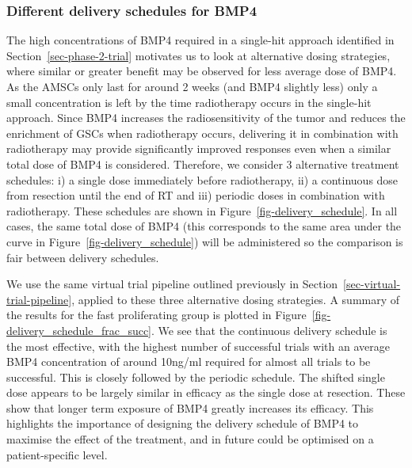\documentclass[
  letterpaper,
]{scrreprt}
\theoremstyle{definition}
\theoremstyle{remark}
\begin{document}
\subsubsection{Different delivery schedules for
BMP4}\label{different-delivery-schedules-for-bmp4}

The high concentrations of BMP4 required in a single-hit approach
identified in Section~\ref{sec-phase-2-trial} motivates us to look at
alternative dosing strategies, where similar or greater benefit may be
observed for less average dose of BMP4. As the AMSCs only last for
around 2 weeks (and BMP4 slightly less) only a small concentration is
left by the time radiotherapy occurs in the single-hit approach. Since
BMP4 increases the radiosensitivity of the tumor and reduces the
enrichment of GSCs when radiotherapy occurs, delivering it in
combination with radiotherapy may provide significantly improved
responses even when a similar total dose of BMP4 is considered.
Therefore, we consider 3 alternative treatment schedules: i) a single
dose immediately before radiotherapy, ii) a continuous dose from
resection until the end of RT and iii) periodic doses in combination
with radiotherapy. These schedules are shown in
Figure~\ref{fig-delivery_schedule}. In all cases, the same total dose of
BMP4 (this corresponds to the same area under the curve in
Figure~\ref{fig-delivery_schedule}) will be administered so the
comparison is fair between delivery schedules.

We use the same virtual trial pipeline outlined previously in
Section~\ref{sec-virtual-trial-pipeline}, applied to these three
alternative dosing strategies. A summary of the results for the fast
proliferating group is plotted in
Figure~\ref{fig-delivery_schedule_frac_succ}. We see that the continuous
delivery schedule is the most effective, with the highest number of
successful trials with an average BMP4 concentration of around 10ng/ml
required for almost all trials to be successful. This is closely
followed by the periodic schedule. The shifted single dose appears to be
largely similar in efficacy as the single dose at resection. These show
that longer term exposure of BMP4 greatly increases its efficacy. This
highlights the importance of designing the delivery schedule of BMP4 to
maximise the effect of the treatment, and in future could be optimised
on a patient-specific level.
\end{document}
